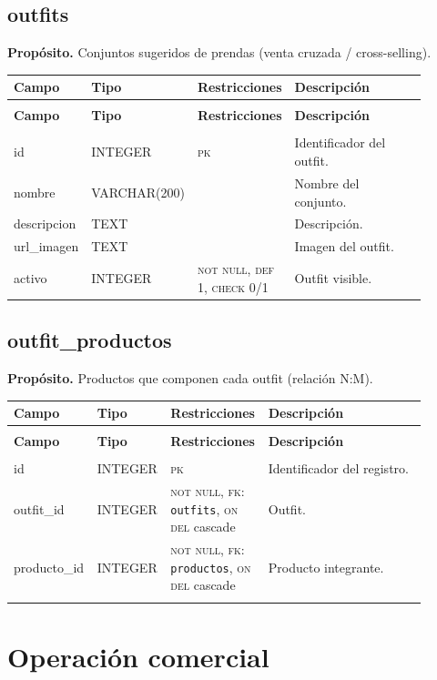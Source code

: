 \documentclass[11pt]{article}
\makeatletter
\newenvironment{campos}{%
  \par\footnotesize
  \setlength{\LTpre}{0.3ex}\setlength{\LTpost}{0.6ex}
  \begin{longtable}{@{}>{\ttfamily}p{0.165\linewidth} >{\ttfamily}p{0.150\linewidth} p{0.205\linewidth} >{\raggedright\arraybackslash}p{0.385\linewidth}@{}}
  \toprule
  \normalfont\bfseries Campo & \normalfont\bfseries Tipo & \normalfont\bfseries Restricciones & \normalfont\bfseries Descripción \\
  \midrule \endfirsthead
  \multicolumn{4}{@{}l}{\footnotesize\itshape \dots\ continuación}\\[0.3ex]
  \toprule
  \normalfont\bfseries Campo & \normalfont\bfseries Tipo & \normalfont\bfseries Restricciones & \normalfont\bfseries Descripción \\
  \midrule \endhead
  \midrule \multicolumn{4}{r@{}}{\footnotesize\itshape continúa en la siguiente página}\\ \endfoot
  \bottomrule \endlastfoot
}{%
  \end{longtable}\par
}
\newcommand{\proposito}[1]{\par\vspace{0.2ex}\noindent\colorbox{brandlight}{\parbox{\dimexpr\linewidth-2\fboxsep}{\small\textbf{Propósito.} #1}}\par\vspace{0.8ex}}
\newcommand{\pk}{\textsc{pk}}
\newcommand{\fk}[1]{\textsc{fk}: \texttt{#1}}
\newcommand{\nn}{\textsc{not null}}
\newcommand{\uq}{\textsc{unique}}
\makeatother
\begin{document}
\subsection{outfits}
\proposito{Conjuntos sugeridos de prendas (venta cruzada / cross-selling).}
\begin{campos}
id          & INTEGER      & \pk{}   & Identificador del outfit. \\
nombre      & VARCHAR(200) &         & Nombre del conjunto. \\
descripcion & TEXT         &         & Descripción. \\
url\_imagen & TEXT         &         & Imagen del outfit. \\
activo      & INTEGER      & \nn, \textsc{def} 1, \textsc{check} 0/1 & Outfit visible. \\
\end{campos}

\subsection{outfit\_productos}
\proposito{Productos que componen cada outfit (relación N:M).}
\begin{campos}
id          & INTEGER & \pk{}    & Identificador del registro. \\
outfit\_id  & INTEGER & \nn, \fk{outfits}, \textsc{on del} cascade & Outfit. \\
producto\_id & INTEGER & \nn, \fk{productos}, \textsc{on del} cascade & Producto integrante. \\
\multicolumn{4}{@{}p{0.97\linewidth}}{\footnotesize\itshape Regla de tabla: \uq{} (\texttt{outfit\_id}, \texttt{producto\_id}).} \\
\end{campos}

\section{Operación comercial}
\end{document}
